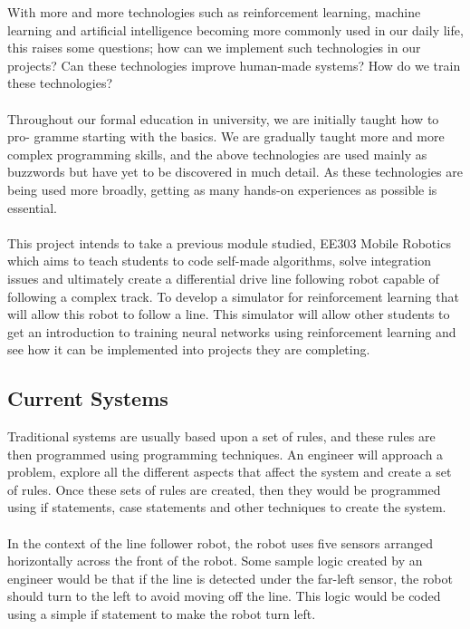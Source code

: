\documentclass[a4paper,11pt]{article}
\begin{document}
With more and more technologies such as reinforcement learning, machine learning and artificial intelligence becoming more commonly used in our daily life, this raises some questions; how can we implement such technologies in our projects? Can these technologies improve human-made systems? How do we train these technologies?
\\\\
Throughout our formal education in university, we are initially taught how to pro- gramme starting with the basics. We are gradually taught more and more complex programming skills, and the above technologies are used mainly as buzzwords but have yet to be discovered in much detail. As these technologies are being used more broadly, getting as many hands-on experiences as possible is essential.
\\\\
This project intends to take a previous module studied, EE303 Mobile Robotics which aims to teach students to code self-made algorithms, solve integration issues and ultimately create a differential drive line following robot capable of following a complex track. To develop a simulator for reinforcement learning that will allow this robot to follow a line. This simulator will allow other students to get an introduction to training neural networks using reinforcement learning and see how it can be implemented into projects they are completing.

\subsection{Current Systems}

Traditional systems are usually based upon a set of rules, and these rules are then programmed using programming techniques. An engineer will approach a problem, explore all the different aspects that affect the system and create a set of rules. Once these sets of rules are created, then they would be programmed using if statements, case statements and other techniques to create the system.
\\\\
In the context of the line follower robot, the robot uses five sensors arranged horizontally across the front of the robot. Some sample logic created by an engineer would be that if the line is detected under the far-left sensor, the robot should turn to the left to avoid moving off the line. This logic would be coded using a simple if statement to make the robot turn left.
\end{document}
